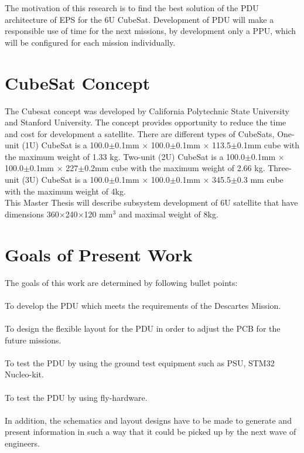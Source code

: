 The motivation of this research is to find the best solution of the PDU architecture of EPS for the 6U CubeSat. Development of PDU will make a responsible use of time for the next missions, by development only a PPU, which will be configured for each mission individually.\\


\section{CubeSat Concept}
The Cubesat concept was developed by California Polytechnic State University and Stanford University. The concept provides opportunity to reduce the time and cost for development a satellite. There are different types of CubeSats, One-unit (1U) CubeSat is a 100.0$\pm$0.1mm $\times$ 100.0$\pm$0.1mm $\times$ 113.5$\pm$0.1mm cube with the maximum weight of 1.33 kg. Two-unit (2U) CubeSat is a 100.0$\pm$0.1mm $\times$ 100.0$\pm$0.1mm $\times$ 227$\pm$0.2mm cube with the maximum weight of 2.66 kg. Three-unit (3U) CubeSat is a 100.0$\pm$0.1mm $\times$ 100.0$\pm$0.1mm $\times$ 345.5$\pm$0.3 mm cube with the maximum weight of 4kg.\\

 This Master Thesis will describe subsystem development of 6U satellite that have dimensions 360$\times$240$\times$120 mm$^3$ and maximal weight of 8kg.\\ 

\section{Goals of Present Work\label{Goals}}
The goals of this work are determined by following bullet points:\\ \\
  To develop the PDU which meets the requirements of the Descartes Mission.\\ \\
  To design the flexible layout for the PDU in order to adjust the PCB for the future missions.\\ \\
 To test the PDU by using the ground test equipment such as PSU, STM32 Nucleo-kit.\\ \\
  To test the PDU by using fly-hardware.\\ \\

In addition, the schematics and layout designs have to be made to generate and present information in such a way that it could be picked up by the next wave of engineers.



